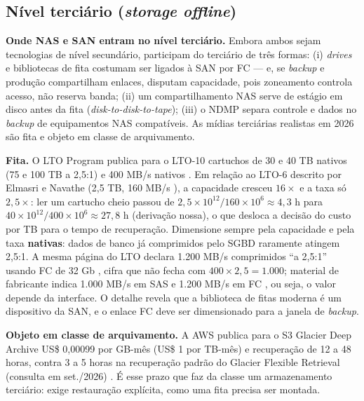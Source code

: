 \documentclass[11pt,a4paper]{article}
\begin{document}
\subsection{Nível terciário (\textit{storage offline})}
\label{sec:recterciario}

\textbf{Onde NAS e SAN entram no nível terciário.} Embora ambos sejam tecnologias de nível secundário,
participam do terciário de três formas: (i) \textit{drives} e bibliotecas de fita costumam ser ligados à
SAN por FC --- e, se \textit{backup} e produção compartilham enlaces, disputam capacidade, pois zoneamento
controla acesso, não reserva banda; (ii) um compartilhamento NAS serve de estágio em disco antes da fita
(\textit{disk-to-disk-to-tape}); (iii) o NDMP separa controle e dados no \textit{backup} de equipamentos
NAS compatíveis. As mídias terciárias realistas em 2026 são fita e objeto em classe de arquivamento.

\textbf{Fita.} O LTO Program publica para o LTO-10 cartuchos de 30 e 40 TB nativos (75 e 100 TB a
2,5:1) e 400 MB/s nativos \cite{lto10}. Em relação ao LTO-6 descrito por Elmasri e Navathe (2,5 TB,
160 MB/s \cite{elmasri2018}), a capacidade cresceu $16\times$ e a taxa só $2{,}5\times$: ler um cartucho
cheio passou de $2{,}5 \times 10^{12} / 160 \times 10^{6} \approx 4{,}3$ h para
$40 \times 10^{12} / 400 \times 10^{6} \approx 27{,}8$ h (derivação nossa), o que desloca a decisão do
custo por TB para o tempo de recuperação. Dimensione sempre pela capacidade e pela taxa
\textbf{nativas}: dados de banco já comprimidos pelo SGBD raramente atingem 2,5:1. A mesma página do LTO
declara 1.200 MB/s comprimidos ``a 2,5:1'' usando FC de 32 Gb \cite{lto10}, cifra que não fecha com
$400 \times 2{,}5 = 1.000$; material de fabricante indica 1.000 MB/s em SAS e 1.200 MB/s em FC
\cite{blocksfiles2025}, ou seja, o valor depende da interface. O detalhe revela que a biblioteca de fitas
moderna é um dispositivo da SAN, e o enlace FC deve ser dimensionado para a janela de \textit{backup}.

\textbf{Objeto em classe de arquivamento.} A AWS publica para o S3 Glacier Deep Archive US\$ 0,00099 por
GB-mês (US\$ 1 por TB-mês) e recuperação de 12 a 48 horas, contra 3 a 5 horas na recuperação padrão do
Glacier Flexible Retrieval (consulta em set./2026) \cite{awsglacier}. É esse prazo que faz da classe um
armazenamento terciário: exige restauração explícita, como uma fita precisa ser montada.
\end{document}
